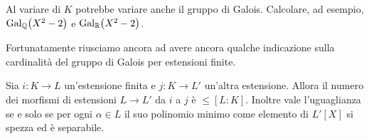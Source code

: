 \begin{eser}
Al variare di \(K\) potrebbe variare anche il gruppo di Galois. Calcolare, ad esempio, \(\Gal[\Q]{X^2-2}\) e \(\Gal[\R]{X^2-2}\).
\end{eser}

\begin{esem}
\nota{\dots}
\end{esem}

Fortunatamente riusciamo ancora ad avere ancora qualche indicazione sulla cardinalità del gruppo di Galois per estensioni finite.

\begin{lemm}\label{lemm:NumeroMorfismiEstensioniDaEstensioneFinita}
Sia \(i : K \to L\) un'estensione finita e \(j : K \to L'\) un'altra estensione. Allora il numero dei morfismi di estensioni \(L \to L'\) da \(i\) a \(j\) è \(\le [L:K]\). Inoltre vale l'uguaglianza se e solo se per ogni \(\alpha \in L\) il suo polinomio minimo come elemento di \(L'[X]\) si spezza ed è separabile.
\end{lemm}

